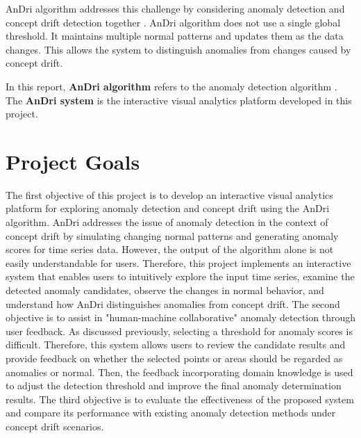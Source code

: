 AnDri algorithm addresses this challenge by considering anomaly detection and concept drift detection together \citep{park2025andri,park2025adaptive}. AnDri algorithm does not use a single global threshold. It maintains multiple normal patterns and updates them as the data changes. This allows the system to distinguish anomalies from changes caused by concept drift.

In this report, \textbf{AnDri algorithm} refers to the anomaly detection algorithm \citep{park2025adaptive}. The \textbf{AnDri system} is the interactive visual analytics platform developed in this project.  

\section{Project Goals}

The first objective of this project is to develop an interactive visual analytics platform for exploring anomaly detection and concept drift using the AnDri algorithm. AnDri addresses the issue of anomaly detection in the context of concept drift by simulating changing normal patterns and generating anomaly scores for time series data. However, the output of the algorithm alone is not easily understandable for users. Therefore, this project implements an interactive system that enables users to intuitively explore the input time series, examine the detected anomaly candidates, observe the changes in normal behavior, and understand how AnDri distinguishes anomalies from concept drift. The second objective is to assist in "human-machine collaborative" anomaly detection through user feedback. As discussed previously, selecting a threshold for anomaly scores is difficult. Therefore, this system allows users to review the candidate results and provide feedback on whether the selected points or areas should be regarded as anomalies or normal. Then, the feedback incorporating domain knowledge is used to adjust the detection threshold and improve the final anomaly determination results. The third objective is to evaluate the effectiveness of the proposed system and compare its performance with existing anomaly detection methods under concept drift scenarios.


